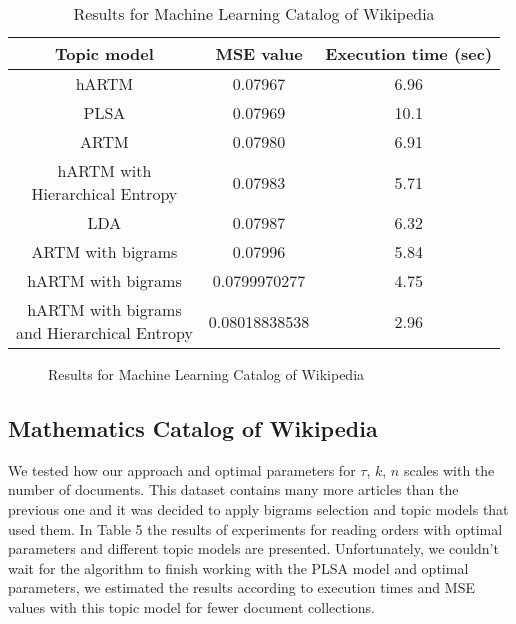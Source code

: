 \documentclass[12pt,twoside]{article}
\begin{document}
    \begin{table}[H]
        \centering
        \begin{tabular}{|c|c|c|}
        \hline
        Topic model & MSE value & Execution time (sec)\\
        \hline
        hARTM & 0.07967 & 6.96 \\
        PLSA  & 0.07969 & 10.1 \\
        ARTM  & 0.07980 & 6.91 \\
        \specialcell{hARTM with \\ Hierarchical Entropy} & 0.07983 & 5.71 \\
        LDA   & 0.07987 & 6.32 \\
        ARTM with bigrams & 0.07996 & 5.84 \\
        hARTM with bigrams & 0.0799970277 & 4.75 \\
        \specialcell{hARTM with bigrams \\ and Hierarchical Entropy} & 0.08018838538 & 2.96 \\
        \hline
        \end{tabular}
        \caption{Results for Machine Learning Catalog of Wikipedia}
    \end{table}
    
    \begin{figure}
    \centering
	\caption{Results for Machine Learning Catalog of Wikipedia}
	\end{figure}
	
	\subsection{Mathematics Catalog of Wikipedia}
	We tested how our approach and optimal parameters for $\tau$, $k$, $n$ scales with the number of documents. This dataset contains many more articles than the previous one and it was decided to apply bigrams selection and topic models that used them. In Table 5 the results of experiments for reading orders with optimal parameters and different topic models are presented. Unfortunately, we couldn't wait for the algorithm to finish working with the PLSA model and optimal parameters, we estimated the results according to execution times and MSE values with this topic model for fewer document collections.
	
\end{document}
